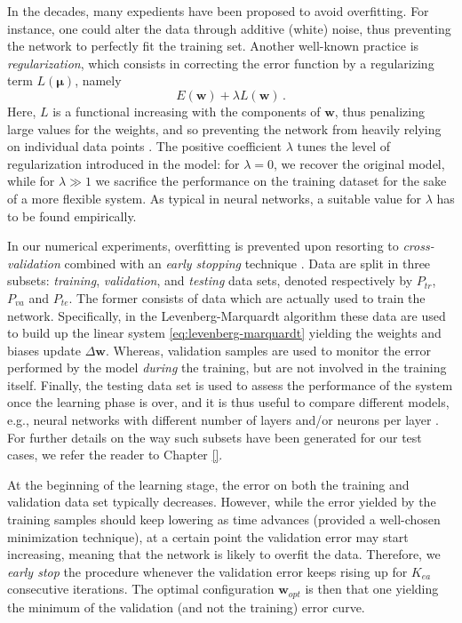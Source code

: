 \documentclass[12pt, a4paper, twoside, openright]{report}
\numberwithin{equation}{chapter}
\theoremstyle{theorem}
\theoremstyle{definition}
\theoremstyle{remark}
\theoremstyle{proposition}
\numberwithin{figure}{chapter}
\begin{document}
		In the decades, many expedients have been proposed to avoid overfitting. For instance, one could alter the data through additive (white) noise, thus preventing the network to perfectly fit the training set. Another well-known practice is \emph{regularization}, which consists in correcting the error function by a regularizing term $L(\mathbf{\mu})$, namely
		\begin{equation*}
			E(\mathbf{w}) + \lambda L(\mathbf{w}) \, .
		\end{equation*}
		Here, $L$ is a functional increasing with the components of $\mathbf{w}$, thus penalizing large values for the weights, and so preventing the network from heavily relying on individual data points \cite{Mat16}. The positive coefficient $\lambda$ tunes the level of regularization introduced in the model: for $\lambda = 0$, we recover the original model, while for $\lambda \gg 1$ we sacrifice the performance on the training dataset for the sake of a more flexible system. As typical in neural networks, a suitable value for $\lambda$ has to be found empirically. 
		
		In our numerical experiments, overfitting is prevented upon resorting to \emph{cross-validation} combined with an \emph{early stopping} technique \cite{Koh95}. Data are split in three subsets: \emph{training}, \emph{validation}, and \emph{testing} data sets, denoted respectively by $P_{tr}$, $P_{va}$ and $P_{te}$. The former consists of data which are actually used to train the network. Specifically, in the Levenberg-Marquardt algorithm these data are used to build up the linear system \eqref{eq:levenberg-marquardt} yielding the weights and biases update $\Delta \mathbf{w}$. Whereas, validation samples are used to monitor the error performed by the model \emph{during} the training, but are not involved in the training itself. Finally, the testing data set is used to assess the performance of the system once the learning phase is over, and it is thus useful to compare different models, e.g., neural networks with different number of layers and/or neurons per layer \cite{Mat16}. For further details on the way such subsets have been generated for our test cases, we refer the reader to Chapter \ref{}.
		
		At the beginning of the learning stage, the error on both the training and validation data set typically decreases. However, while the error yielded by the training samples should keep lowering as time advances (provided a well-chosen minimization technique), at a certain point the validation error may start increasing, meaning that the network is likely to overfit the data. Therefore, we \emph{early stop} the procedure whenever the validation error keeps rising up for $K_{ea}$ consecutive iterations. The optimal configuration $\mathbf{w}_{opt}$ is then that one yielding the minimum of the validation (and not the training) error curve.
		
\end{document}
